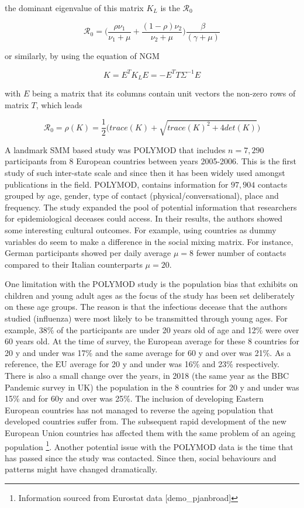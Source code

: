 \documentclass[12pt]{article}
\begin{document}
the dominant eigenvalue of this matrix $K_{L}$ is the $\mathcal{R_{0}}$


\begin{equation}
\mathcal{R}_{0} = \bigg( \frac{\rho \nu_{1}}{\nu_{1} + \mu} + \frac{(1-\rho) \nu_{2}}{\nu_{2} + \mu}  \bigg) \frac{\beta}{(\gamma + \mu)}
\end{equation}

or similarly, by using the equation of NGM

\begin{equation}
K=E^{T}K_{L}E=-E^{T}T\Sigma^{-1}E
\end{equation}

with $E$ being a matrix that its columns contain unit vectors the non-zero rows of matrix $T$, which leads

\begin{equation}
\mathcal{R}_{0}  = \rho (K) = \frac{1}{2} \bigg( trace(K) + \sqrt{trace(K)^{2} + 4det(K)} \bigg)
\end{equation}

A landmark SMM based study was POLYMOD \cite{Mossong:2008} that includes $n=7,290$ participants from 8 European countries between years 2005-2006. This is the first study of such inter-state scale and since then it has been widely used amongst publications in the field. POLYMOD, contains information for $97,904$ contacts grouped by age, gender, type of contact (physical/conversational), place and frequency. The study expanded the pool of potential information that researchers for epidemiological deceases could access. In their results, the authors showed some interesting cultural outcomes. For example, using countries as dummy variables do seem to make a difference in the social mixing matrix. For instance, German participants showed per daily average $\mu=8$ fewer number of contacts compared to their Italian counterparts $\mu=20$. 

One limitation with the POLYMOD study is the population bias that exhibits on children and young adult ages as the focus of the study has been set deliberately on these age groups. The reason is that the infectious decease that the authors studied (influenza) were most likely to be transmitted through young ages. For example, 38\% of the participants are under 20 years old of age and 12\% were over 60 years old. At the time of survey, the European average for these 8 countries for 20 y and under was 17\% and the same average for 60 y and over was 21\%. As a reference, the EU average for 20 y and under was 16\% and 23\% respectively. There is also a small change over the years, in 2018 (the same year as the BBC Pandemic survey in UK) the population in the 8 countries for 20 y and under was 15\% and for 60y and over was 25\%. The inclusion of developing Eastern European countries has not managed to reverse the ageing population that developed countries suffer from. The subsequent rapid development of the new European Union countries has affected them with the same problem of an ageing population \footnote{Information sourced from Eurostat data [demo\_pjanbroad]}. Another potential issue with the POLYMOD data is the time that has passed since the study was contacted. Since then, social behaviours and patterns might have changed dramatically. 
\end{document}
